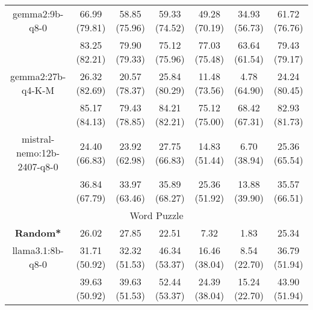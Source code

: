 \begin{table}[]
{\begin{tabular}{ccccccc}
        \multicolumn{1}{c|}{gemma2:9b-q8-0} & 66.99 (79.81) & 58.85 (75.96) & \multicolumn{1}{c|}{59.33 (74.52)} & 49.28 (70.19) & \multicolumn{1}{c|}{34.93 (56.73)} & 61.72 (76.76) \\
        
        

        \multicolumn{1}{c|}{} & 83.25 (82.21) & 79.90 (79.33) & \multicolumn{1}{c|}{75.12 (75.96)} & 77.03 (75.48) & \multicolumn{1}{c|}{63.64 (61.54)} & 79.43 (79.17) \\
        \cline{1-7}
        

        \multicolumn{1}{c|}{gemma2:27b-q4-K-M} & 26.32 (82.69) & 20.57 (78.37) & \multicolumn{1}{c|}{25.84 (80.29)} & 11.48 (73.56) & \multicolumn{1}{c|}{4.78 (64.90)} & 24.24 (80.45) \\
        
        

        \multicolumn{1}{c|}{} & 85.17 (84.13) & 79.43 (78.85) & \multicolumn{1}{c|}{84.21 (82.21)} & 75.12 (75.00) & \multicolumn{1}{c|}{68.42 (67.31)} & 82.93 (81.73) \\
        \cline{1-7}
        

        \multicolumn{1}{c|}{mistral-nemo:12b-2407-q8-0} & 24.40 (66.83) & 23.92 (62.98) & \multicolumn{1}{c|}{27.75 (66.83)} & 14.83 (51.44) & \multicolumn{1}{c|}{6.70 (38.94)} & 25.36 (65.54) \\
        
        

        \multicolumn{1}{c|}{} & 36.84 (67.79) & 33.97 (63.46) & \multicolumn{1}{c|}{35.89 (68.27)} & 25.36 (51.92) & \multicolumn{1}{c|}{13.88 (39.90)} & 35.57 (66.51) \\
        \cline{1-7}
        
\hline
\multicolumn{7}{c}{Word Puzzle} \\ \hline
\multicolumn{1}{c|}{\textbf{Random*}} & 26.02 & 27.85 & \multicolumn{1}{c|}{22.51} & 7.32 & \multicolumn{1}{c|}{1.83} & 25.34 \\ \hline

        \multicolumn{1}{c|}{llama3.1:8b-q8-0} & 31.71 (50.92) & 32.32 (51.53) & \multicolumn{1}{c|}{46.34 (53.37)} & 16.46 (38.04) & \multicolumn{1}{c|}{8.54 (22.70)} & 36.79 (51.94) \\
        
        

        \multicolumn{1}{c|}{} & 39.63 (50.92) & 39.63 (51.53) & \multicolumn{1}{c|}{52.44 (53.37)} & 24.39 (38.04) & \multicolumn{1}{c|}{15.24 (22.70)} & 43.90 (51.94) \\
        \cline{1-7}
        


\end{tabular}}
\end{table}
